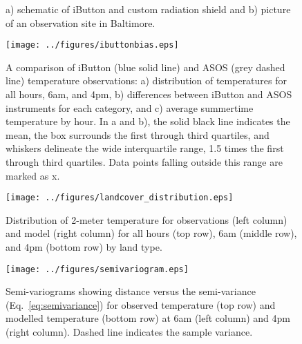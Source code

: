 \documentclass[draft,linenumbers]{agujournal}
\begin{document}
 \begin{figure}[h]
\centering
\caption{a) schematic of iButton and custom radiation shield and b) picture of an observation site in Baltimore.}
\label{fig:ibutton}
 \end{figure}
 
\begin{figure}[h]
\centering
\texttt{[image: ../figures/ibuttonbias.eps]}
\caption{A comparison of iButton (blue solid line) and ASOS (grey dashed line) temperature observations: a) distribution of temperatures for all hours,  6am, and 4pm, b) differences between iButton and ASOS instruments for each category, and c) average summertime temperature by hour. In a and b), the solid black line indicates the mean, the box surrounds the first through third quartiles, and whiskers delineate the wide interquartile range, 1.5 times the first through third quartiles. Data points falling outside this range are marked as x. }
\label{fig:bias}
\end{figure}



\begin{figure}[h]
\centering
\texttt{[image: ../figures/landcover\_distribution.eps]}
\caption{Distribution of 2-meter temperature for observations (left column) and model (right column) for all hours (top row), 6am (middle row), and 4pm (bottom row) by land type. }
\label{fig:hist}
\end{figure}


\begin{figure}[h]
\centering
\texttt{[image: ../figures/semivariogram.eps]}
\caption{Semi-variograms showing distance versus the semi-variance (Eq.~\ref{eq:semivariance}) for observed temperature (top row) and modelled temperature (bottom row) at 6am (left column) and 4pm (right column). Dashed line indicates the sample variance. 
}\label{fig:semiv_obs}
\end{figure}
\end{document}
